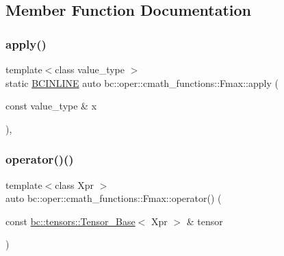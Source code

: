 \subsection{Member Function Documentation}
\mbox{\label{structbc_1_1oper_1_1cmath__functions_1_1Fmax_ab1f5d45b0298d150a017085e26852c59}} 
\subsubsection{\texorpdfstring{apply()}{apply()}}
{\footnotesize\ttfamily template$<$class value\+\_\+type $>$ \\
static \hyperlink{common_8h_a6699e8b0449da5c0fafb878e59c1d4b1}{B\+C\+I\+N\+L\+I\+NE} auto bc\+::oper\+::cmath\+\_\+functions\+::\+Fmax\+::apply (\begin{DoxyParamCaption}\item[{const value\+\_\+type \&}]{x }\end{DoxyParamCaption})\hspace{0.3cm}{\ttfamily [inline]}, {\ttfamily [static]}}

\mbox{\label{structbc_1_1oper_1_1cmath__functions_1_1Fmax_a1e2ee21217bf179f7a55191d300c1ef6}} 
\subsubsection{\texorpdfstring{operator()()}{operator()()}\hspace{0.1cm}{\footnotesize\ttfamily [1/3]}}
{\footnotesize\ttfamily template$<$class Xpr $>$ \\
auto bc\+::oper\+::cmath\+\_\+functions\+::\+Fmax\+::operator() (\begin{DoxyParamCaption}\item[{const \hyperlink{classbc_1_1tensors_1_1Tensor__Base}{bc\+::tensors\+::\+Tensor\+\_\+\+Base}$<$ Xpr $>$ \&}]{tensor }\end{DoxyParamCaption})\hspace{0.3cm}{\ttfamily [inline]}}

